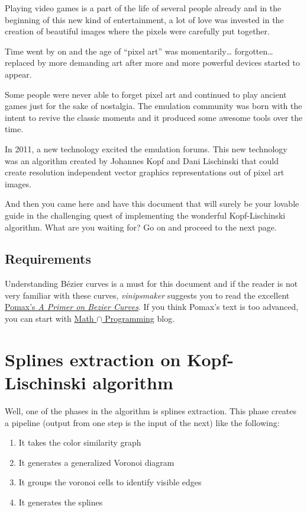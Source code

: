 \documentclass{report}
\begin{document}
Playing video games is a part of the life of several people already and in the
beginning of this new kind of entertainment, a lot of love was invested in the
creation of beautiful images where the pixels were carefully put together.

Time went by on and the age of ``pixel art'' was momentarily\ldots{}
forgotten\ldots{} replaced by more demanding art after more and more powerful
devices started to appear.

Some people were never able to forget pixel art and continued to play ancient
games just for the sake of nostalgia. The emulation community was born with the
intent to revive the classic moments and it produced some awesome tools over the
time.

In 2011, a new technology excited the emulation forums. This new technology was
an algorithm created by Johannes Kopf and Dani Lischinski that could create
resolution independent vector graphics representations out of pixel art images.

And then you came here and have this document that will surely be your lovable
guide in the challenging quest of implementing the wonderful Kopf-Lischinski
algorithm. What are you waiting for? Go on and proceed to the next page.

\section{Requirements}

Understanding Bézier curves is a must for this document and if the reader is not
very familiar with these curves, \emph{vinipsmaker} suggests you to read the
excellent \href{http://pomax.github.io/bezierinfo/}{Pomax's \emph{A Primer on
Bezier Curves}}. If you think Pomax's text is too advanced, you can start with
\href{http://jeremykun.com/2013/05/11/bezier-curves-and-picasso/}{Math $\cap$
Programming} blog.

\chapter{Splines extraction on Kopf-Lischinski algorithm}

Well, one of the phases in the algorithm is splines extraction. This phase
creates a pipeline (output from one step is the input of the next) like the
following:

\begin{enumerate}
\item It takes the color similarity graph
\item It generates a generalized Voronoi diagram
\item It groups the voronoi cells to identify visible edges
\item It generates the splines
\end{enumerate}
\end{document}
